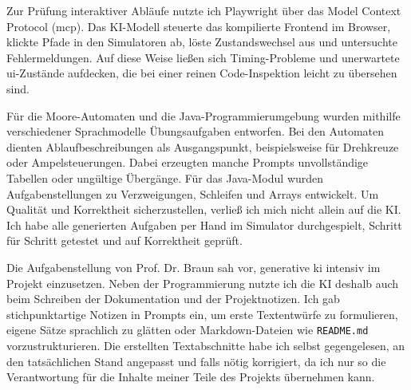 Zur Prüfung interaktiver Abläufe nutzte ich Playwright über das Model Context Protocol (\gls{mcp}). Das KI-Modell steuerte das kompilierte Frontend im Browser, klickte Pfade in den Simulatoren ab, löste Zustandswechsel aus und untersuchte Fehlermeldungen. Auf diese Weise ließen sich Timing-Probleme und unerwartete \gls{ui}-Zustände aufdecken, die bei einer reinen Code-Inspektion leicht zu übersehen sind.


Für die Moore-Automaten und die Java-Programmierumgebung wurden mithilfe verschiedener Sprachmodelle Übungsaufgaben entworfen. Bei den Automaten dienten Ablaufbeschreibungen als Ausgangspunkt, beispielsweise für Drehkreuze oder Ampelsteuerungen. Dabei erzeugten manche Prompts unvollständige Tabellen oder ungültige Übergänge. Für das Java-Modul wurden Aufgabenstellungen zu Verzweigungen, Schleifen und Arrays entwickelt. Um Qualität und Korrektheit sicherzustellen, verließ ich mich nicht allein auf die KI. Ich habe alle generierten Aufgaben per Hand im Simulator durchgespielt, Schritt für Schritt getestet und auf Korrektheit geprüft.


Die Aufgabenstellung von Prof. Dr. Braun sah vor, generative \gls{ki} intensiv im Projekt einzusetzen. Neben der Programmierung nutzte ich die KI deshalb auch beim Schreiben der Dokumentation und der Projektnotizen. Ich gab stichpunktartige Notizen in Prompts ein, um erste Textentwürfe zu formulieren, eigene Sätze sprachlich zu glätten oder Markdown-Dateien wie \texttt{README.md} vorzustrukturieren. Die erstellten Textabschnitte habe ich selbst gegengelesen, an den tatsächlichen Stand angepasst und falls nötig korrigiert, da ich nur so die Verantwortung für die Inhalte meiner Teile des Projekts übernehmen kann.


